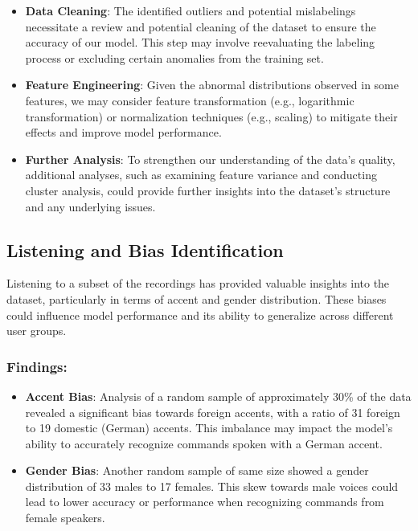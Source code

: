 \begin{itemize}
    \item \textbf{Data Cleaning}: The identified outliers and potential mislabelings necessitate a review and potential cleaning of the dataset to ensure the accuracy of our model. This step may involve reevaluating the labeling process or excluding certain anomalies from the training set.
    \item \textbf{Feature Engineering}: Given the abnormal distributions observed in some features, we may consider feature transformation (e.g., logarithmic transformation) or normalization techniques (e.g., scaling) to mitigate their effects and improve model performance.
    \item \textbf{Further Analysis}: To strengthen our understanding of the data's quality, additional analyses, such as examining feature variance and conducting cluster analysis, could provide further insights into the dataset's structure and any underlying issues.
\end{itemize}

\subsection{Listening and Bias Identification}

Listening to a subset of the recordings has provided valuable insights into the dataset, particularly in terms of accent and gender distribution. These biases could influence model performance and its ability to generalize across different user groups.

\subsubsection{Findings:}

\begin{itemize}
    \item \textbf{Accent Bias}: Analysis of a random sample of approximately 30\% of the data
    revealed a significant bias towards foreign accents, with a ratio of 31 foreign to
    19 domestic (German) accents.
    This imbalance may impact the model’s ability to accurately recognize commands spoken
    with a German accent.
    \item \textbf{Gender Bias}: Another random sample of same size showed a gender distribution of 33 males to 17 females. This skew towards male voices could lead to lower accuracy or performance when recognizing commands from female speakers.
\end{itemize}

